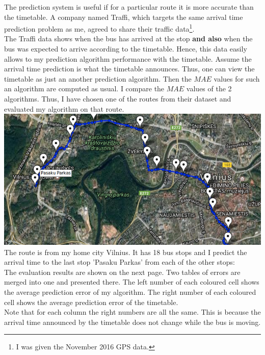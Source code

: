 \documentclass[12pt,a4paper,oneside,openright]{report}
\begin{document}
The prediction system is useful if for a particular route it is more accurate than
the timetable. A company named Traffi, which targets the same arrival time prediction
problem as me, agreed to share their traffic
data\footnote{I was given the November 2016 GPS data.}. \\

The Traffi data shows when the
bus has arrived at the stop \textbf{and also} when the bus was expected to arrive
according to the timetable. Hence, this data easily allows to my prediction
algorithm performance with the timetable. Assume the
arrival time prediction is what the timetable announces. Thus, one can view the
timetable as just an another prediction algorithm. Then the $MAE$ values for such an
algorithm are computed as usual. I compare the $MAE$ values of the 2 algorithms.
Thus, I have chosen one of the routes from their dataset and evaluated my algorithm
on that route. \\

\includegraphics[width=\textwidth]{figs/vilnius_route.png} \\

The route is from my home city Vilnius. It has 18 bus stops and
I predict the arrival time to the last stop 'Pasaku Parkas' from each
of the other stops: \\


The evaluation results are shown on the next page. Two tables of errors are merged
into one and presented there. The left number of each coloured cell shows the
average prediction error of my algorithm. The right number of each coloured cell
shows the average prediction error of the timetable. \\


Note that for each column the right numbers are all the same. This is because the
arrival time announced by the timetable does not change while the bus is moving. \\
\end{document}
